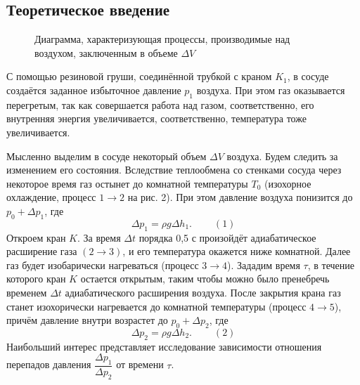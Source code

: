 \documentclass[a4paper,11.5pt]{article} %
\begin{document}
\subsection{Теоретическое введение}

\begin{figure}[h]
	\caption{Диаграмма, характеризующая процессы, производимые над воздухом, заключенным в объеме $\Delta V$}
\end{figure}


С помощью резиновой груши, соединённой трубкой с краном $K_1$, в сосуде создаётся заданное избыточное давление $p_1$ воздуха. При этом газ оказывается перегретым, так как совершается работа над газом, соответственно, его внутренняя энергия увеличивается, соответственно, температура тоже увеличивается.

Мысленно выделим в сосуде некоторый объем $\Delta V$ воздуха. Будем следить за изменением его состояния. Вследствие теплообмена со стенками сосуда через некоторое время газ остынет до комнатной температуры $T_0$ (изохорное охлаждение, процесс $1 \longrightarrow 2$ на рис. 2). При этом давление воздуха понизится до $p_0 + \Delta p_1$, где $$\Delta p_1 = \rho g \Delta h_1.~~~~~~~~~~(1)$$
Откроем кран $K$. За время $\Delta t$ порядка 0,5 с произойдёт адиабатическое расширение газа $(2 \longrightarrow 3)$, и его температура окажется ниже комнатной. Далее газ будет изобарически нагреваться (процесс $3 \longrightarrow 4$). Зададим время $\tau$, в течение которого кран $K$ остается открытым, таким чтобы можно было пренебречь временем $\Delta t$ адиабатического расширения воздуха. После закрытия крана газ станет изохорически нагревается до комнатной температуры (процесс $4 \longrightarrow 5$), причём давление внутри возрастет до $p_0 + \Delta p_2$, где $$\Delta p_2 = \rho g \Delta h_2.~~~~~~~~~~(2)$$
Наибольший интерес представляет исследование зависимости отношения перепадов давления $\dfrac{\Delta p_1}{\Delta p_2}$ от времени $\tau$.
\end{document}
